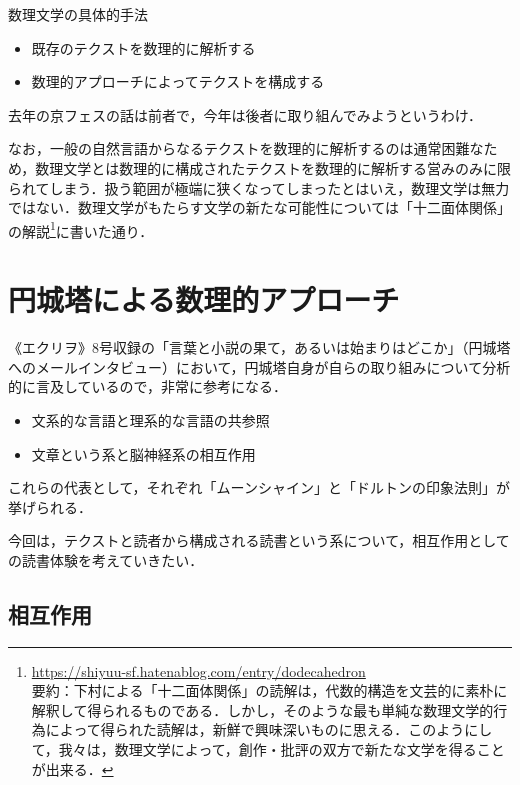 \documentclass[10pt, a5paper, twoside]{jsarticle}
\theoremstyle{definition}
\begin{document}
		数理文学の具体的手法

		\begin{itemize}
			
			\item 既存のテクストを数理的に解析する
			
			\item 数理的アプローチによってテクストを構成する
		
		\end{itemize}

		去年の京フェスの話は前者で，今年は後者に取り組んでみようというわけ．

		なお，一般の自然言語からなるテクストを数理的に解析するのは通常困難なため，数理文学とは数理的に構成されたテクストを数理的に解析する営みのみに限られてしまう．扱う範囲が極端に狭くなってしまったとはいえ，数理文学は無力ではない．数理文学がもたらす文学の新たな可能性については「十二面体関係」の解説\footnote{\url{https://shiyuu-sf.hatenablog.com/entry/dodecahedron} \\ 要約：下村による「十二面体関係」の読解は，代数的構造を文芸的に素朴に解釈して得られるものである．しかし，そのような最も単純な数理文学的行為によって得られた読解は，新鮮で興味深いものに思える．このようにして，我々は，数理文学によって，創作・批評の双方で新たな文学を得ることが出来る．}に書いた通り．

	\section{円城塔による数理的アプローチ}

		《エクリヲ》8号収録の「言葉と小説の果て，あるいは始まりはどこか」\cite{ecrito}（円城塔へのメールインタビュー）において，円城塔自身が自らの取り組みについて分析的に言及しているので，非常に参考になる．

		\begin{itemize}

			\item 文系的な言語と理系的な言語の共参照

			\item 文章という系と脳神経系の相互作用

		\end{itemize}

		これらの代表として，それぞれ「ムーンシャイン」と「ドルトンの印象法則」が挙げられる．

		今回は，テクストと読者から構成される読書という系について，相互作用としての読書体験を考えていきたい．

		\subsection{相互作用}
\end{document}
